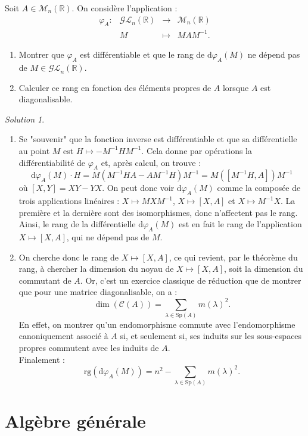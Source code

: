 \documentclass[french]{book}
\newcommand{\R}{\mathbb{R}}
\newcommand{\inv}{^{-1}}
\newcommand{\rg}{\text{rg}}
\renewcommand{\d}{\text{d}}
\theoremstyle{definition}
\theoremstyle{remark}
\newtheorem*{sol}{Solution}
\begin{document}
\begin{exo}[3]{}
	Soit $A\in\mathcal{M}_n(\R)$. On considère l'application :
	$$\begin{array}{lrcl}
		\varphi_A:&\mathcal{GL}_n(\R)&\longrightarrow&\mathcal{M}_n(\R)\\
		&M&\longmapsto&MAM\inv.
	\end{array}$$
	\begin{enumerate}
		\item Montrer que $\varphi_A$ est différentiable et que le rang de $\d \varphi_A(M)$ ne dépend pas de $M\in\mathcal{GL}_n(\R)$.
		\item Calculer ce rang en fonction des éléments propres de $A$ lorsque $A$ est diagonalisable.	
	\end{enumerate}
\end{exo}
\begin{sol}
	\begin{enumerate}
		\item Se "souvenir" que la fonction inverse est différentiable et que sa différentielle au point $M$ est $H\mapsto -M\inv HM\inv$. Cela donne par opérations la différentiabilité de $\varphi_A$ et, après calcul, on trouve :
		$$\d\varphi_A(M)\cdot H=M(M\inv HA-AM\inv H)M\inv=M([M\inv H, A])M\inv$$ où $[X,Y]=XY-YX$. On peut donc voir $\d\varphi_A(M)$ comme la composée de trois applications linéaires : $X\mapsto MXM\inv$, $X\mapsto [X,A]$ et $X\mapsto M\inv X$. La première et la dernière sont des isomorphismes, donc n'affectent pas le rang. Ainsi, le rang de la différentielle $\d\varphi_A(M)$ est en fait le rang de l'application $X\mapsto [X,A]$, qui ne dépend pas de $M$.
		\item On cherche donc le rang de $X\mapsto [X,A]$, ce qui revient, par le théorème du rang, à chercher la dimension du noyau de $X\mapsto[X,A]$, soit la dimension du commutant de $A$. Or, c'est un exercice classique de réduction que de montrer que pour une matrice diagonalisable, on a :
		$$\dim(\mathcal{C}(A))=\sum_{\lambda\in\text{Sp}(A)}m(\lambda)^2.$$En effet, on montrer qu'un endomorphisme commute avec l'endomorphisme canoniquement associé à $A$ si, et seulement si, ses induits sur les sous-espaces propres commutent avec les induits de $A$.\\
		Finalement :
		$$\rg(\d\varphi_A(M))=n^2-\sum_{\lambda\in\text{Sp}(A)}m(\lambda)^2.$$
	\end{enumerate}
\end{sol}

\chapter{Algèbre générale}
\end{document}
